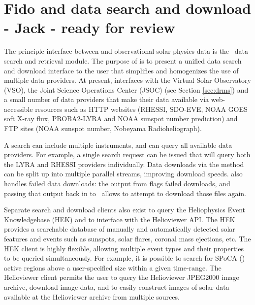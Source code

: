 \section{Fido and data search and download - Jack - ready for review}
\label{sec:fido}

The principle interface between \sunpy and observational solar physics data is the \Fido\ data search and retrieval module. The purpose of \Fido is to present a unified data search and download interface to the user that simplifies and homogenizes the use of multiple data providers.  At present, \Fido interfaces with the Virtual Solar Observatory (VSO), the Joint Science Operations Center (JSOC) (see Section \ref{sec:drms}) and a small number of data providers that make their data available via web-accessible resources such as HTTP websites (RHESSI, SDO-EVE, NOAA GOES soft X-ray flux, PROBA2-LYRA and NOAA sunspot number prediction) and FTP sites (NOAA sunspot number, Nobeyama Radioheliograph).

A \Fido search can include multiple instruments, and can query all available data providers.  For example, a single search request can be issued that will query both the LYRA and RHESSI providers individually.  Data downloads via the  method can be split up into multiple parallel streams, improving download speeds.  \Fido also handles failed data downloads: the output from  flags failed downloads, and passing that output back in to \ allows \Fido to attempt to download those files again.

Separate search and download clients also exist to query the Heliophysics Event Knowledgebase (HEK) and to interface with the Helioviewer API.  The HEK provides a searchable database of manually and automatically detected solar features and events such as sunspots, solar flares, coronal mass ejections, etc.  The HEK client is highly flexible, allowing multiple event types and their properties to be queried simultaneously.  For example, it is possible to search for SPoCA (\cite{2014AA...561A..29V}) active regions above a user-specified size within a given time-range.  The Helioviewer client permits the user to query the Helioviewer JPEG2000 image archive, download image data, and to easily construct images of solar data available at the Helioviewer archive from multiple sources.
